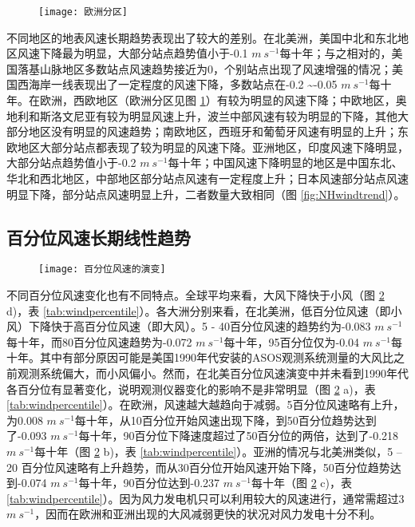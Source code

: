\begin{figure}[!b]
    \centering
    \texttt{[image: 欧洲分区]}
    \label{fig:EU}
\end{figure}

不同地区的地表风速长期趋势表现出了较大的差别。在北美洲，美国中北和东北地区风速下降最为明显，大部分站点趋势值小于-0.1 $m ~ s^{-1}$每十年；与之相对的，美国落基山脉地区多数站点风速趋势接近为0，个别站点出现了风速增强的情况；美国西海岸一线表现出了一定程度的风速下降，多数站点在-0.2 \textasciitilde -0.05 $m ~ s^{-1}$每十年。在欧洲，西欧地区（欧洲分区见图 \ref{fig:EU}）有较为明显的风速下降；中欧地区，奥地利和斯洛文尼亚有较为明显风速上升，波兰中部风速有较为明显的下降，其他大部分地区没有明显的风速趋势；南欧地区，西班牙和葡萄牙风速有明显的上升；东欧地区大部分站点都表现了较为明显的风速下降。亚洲地区，印度风速下降明显，大部分站点趋势值小于-0.2 $m ~ s^{-1}$每十年；中国风速下降明显的地区是中国东北、华北和西北地区，中部地区部分站点风速有一定程度上升；日本风速部分站点风速明显下降，部分站点风速明显上升，二者数量大致相同（图 \ref{fig:NHwindtrend}）。

\subsection{百分位风速长期线性趋势}

\begin{figure}[!b]
    \centering
    \texttt{[image: 百分位风速的演变]}
    \label{fig:windpercentile}
\end{figure}

不同百分位风速变化也有不同特点。全球平均来看，大风下降快于小风（图 \ref{fig:windpercentile} d)，表 \ref{tab:windpercentile}）。各大洲分别来看，在北美洲，低百分位风速（即小风）下降快于高百分位风速（即大风）。5 - 40百分位风速的趋势约为-0.083 $m ~ s^{-1}$每十年，而80百分位风速趋势为-0.072 $m ~ s^{-1}$每十年，95百分位仅为-0.04 $m ~ s^{-1}$每十年。其中有部分原因可能是美国1990年代安装的ASOS观测系统测量的大风比之前观测系统偏大，而小风偏小\citep{mckee2000climate}。然而，在北美百分位风速演变中并未看到1990年代各百分位有显著变化，说明观测仪器变化的影响不是非常明显（图 \ref{fig:windpercentile} a)，表 \ref{tab:windpercentile}）。在欧洲，风速越大越趋向于减弱。5百分位风速略有上升，为0.008 $m ~ s^{-1}$每十年，从10百分位开始风速出现下降，到50百分位趋势达到了-0.093 $m ~ s^{-1}$每十年，90百分位下降速度超过了50百分位的两倍，达到了-0.218 $m ~ s^{-1}$每十年（图 \ref{fig:windpercentile} b)，表 \ref{tab:windpercentile}）。亚洲的情况与北美洲类似，5 – 20 百分位风速略有上升趋势，而从30百分位开始风速开始下降，50百分位趋势达到-0.074 $m ~ s^{-1}$每十年，90百分位达到-0.237 $m ~s^{-1}$每十年（图 \ref{fig:windpercentile} c)，表 \ref{tab:windpercentile}）。因为风力发电机只可以利用较大的风速进行，通常需超过3 $m ~s^{-1}$，因而在欧洲和亚洲出现的大风减弱更快的状况对风力发电十分不利。



